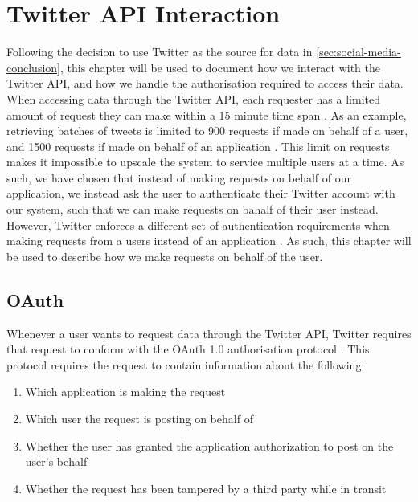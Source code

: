 \chapter{Twitter API Interaction}\label{cha:twitterAPI}
Following the decision to use Twitter as the source for data in
\autoref{sec:social-media-conclusion}, this chapter will be used to document how
we interact with the Twitter API, and how we handle the authorisation required
to access their data. When accessing data through the Twitter API, each
requester has a limited amount of request they can make within a 15 minute time
span \citep{twitterRateLimit}. As an example, retrieving batches of tweets is
limited to 900 requests if made on behalf of a user, and 1500 requests if made
on behalf of an application \citep{twitterTimelineRateLimit}. This limit on
requests makes it impossible to upscale the system to service multiple users at
a time. As such, we have chosen that instead of making requests on behalf of our
application, we instead ask the user to authenticate their Twitter account with
our system, such that we can make requests on bahalf of their user instead.
However, Twitter enforces a different set of authentication requirements when
making requests from a users instead of an application \citep{TwitterAPIAuth}.
As such, this chapter will be used to describe how we make requests on behalf of
the user.\nl


\section{OAuth}\label{sec:OAuth}
Whenever a user wants to request data through the Twitter API, Twitter requires
that request to conform with the OAuth 1.0 authorisation protocol
\citep{OAuth1}. This protocol requires the request to contain information about
the following\citep{TwitterAPIAuth}:

\begin{enumerate}
 	\item Which application is making the request
	\item Which user the request is posting on behalf of
	\item Whether the user has granted the application authorization to post on the
user’s behalf 
	\item Whether the request has been tampered by a third party while in transit
\end{enumerate}

